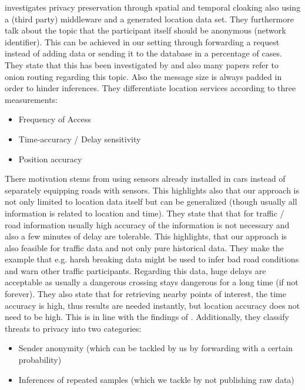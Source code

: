 \parencite{gruteser2003anonymous} investigates privacy preservation through spatial and temporal cloaking also using a (third party) middleware and a generated location data set. They furthermore talk about the topic that the participant itself should be anonymous (network identifier). This can be achieved in our setting through forwarding a request instead of adding data or sending it to the database in a percentage of cases. They state that this has been investigated by \parencite{chaum1981untraceable} and also many papers refer to onion routing regarding this topic. Also the message size is always padded in order to hinder inferences. They differentiate location services according to three measurements:
\begin{itemize}
	\item Frequency of Access
	\item Time-accuracy / Delay sensitivity
	\item Position accuracy
\end{itemize}
There motivation stems from using sensors already installed in cars instead of separately equipping roads with sensors. This highlights also that our approach is not only limited to location data itself but can be generalized (though usually all information is related to location and time). They state that that for traffic / road information usually high accuracy of the information is not necessary and also a few minutes of delay are tolerable. This highlights, that our approach is also feasible for traffic data and not only pure historical data. They make the example that e.g. harsh breaking data might be used to infer bad road conditions and warn other traffic participants. Regarding this data, huge delays are acceptable as usually a dangerous crossing stays dangerous for a long time (if not forever). They also state that for retrieving nearby points of interest, the time accuracy is high, thus results are needed instantly, but location accuracy does not need to be high. This is in line with the findings of \parencite{casper}. Additionally, they classify threats to privacy into two categories:
\begin{itemize}
	\item Sender anonymity (which can be tackled by us by forwarding with a certain probability)
	\item Inferences of repeated samples (which we tackle by not publishing raw data)
\end{itemize}
